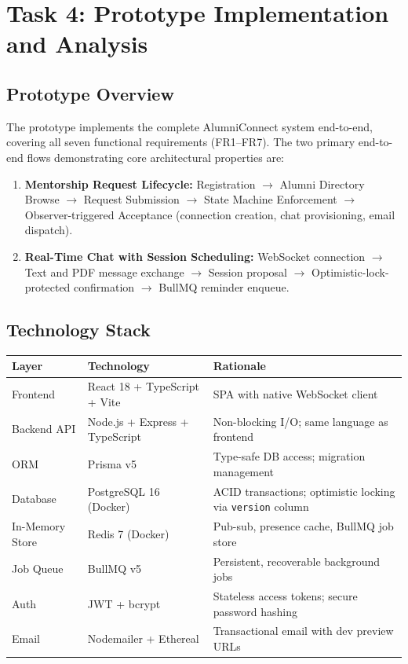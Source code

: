 \documentclass[12pt,a4paper]{article}
\begin{document}
\section{Task 4: Prototype Implementation and Analysis}

\subsection{Prototype Overview}

The prototype implements the complete AlumniConnect system end-to-end, covering all seven functional requirements (FR1--FR7). The two primary end-to-end flows demonstrating core architectural properties are:

\begin{enumerate}
  \item \textbf{Mentorship Request Lifecycle:} Registration $\to$ Alumni Directory Browse $\to$ Request Submission $\to$ State Machine Enforcement $\to$ Observer-triggered Acceptance (connection creation, chat provisioning, email dispatch).
  \item \textbf{Real-Time Chat with Session Scheduling:} WebSocket connection $\to$ Text and PDF message exchange $\to$ Session proposal $\to$ Optimistic-lock-protected confirmation $\to$ BullMQ reminder enqueue.
\end{enumerate}

\subsection{Technology Stack}

\begin{center}
\begin{tabular}{@{}p{3.8cm} p{4.2cm} p{4.5cm}@{}}
\toprule
\textbf{Layer} & \textbf{Technology} & \textbf{Rationale} \\
\midrule
Frontend & React 18 + TypeScript + Vite & SPA with native WebSocket client \\
Backend API & Node.js + Express + TypeScript & Non-blocking I/O; same language as frontend \\
ORM & Prisma v5 & Type-safe DB access; migration management \\
Database & PostgreSQL 16 (Docker) & ACID transactions; optimistic locking via \texttt{version} column \\
In-Memory Store & Redis 7 (Docker) & Pub-sub, presence cache, BullMQ job store \\
Job Queue & BullMQ v5 & Persistent, recoverable background jobs \\
Auth & JWT + bcrypt & Stateless access tokens; secure password hashing \\
Email & Nodemailer + Ethereal & Transactional email with dev preview URLs \\
\bottomrule
\end{tabular}
\end{center}
\end{document}
